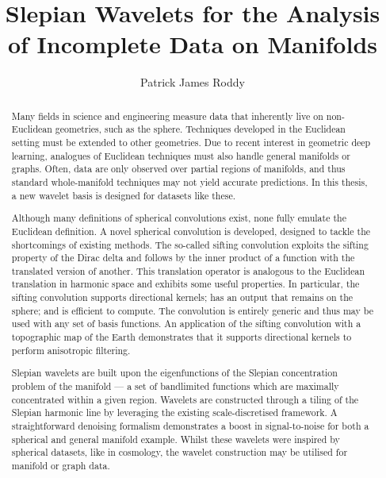 
\title{Slepian Wavelets for the Analysis of Incomplete Data on Manifolds}
\author{Patrick James Roddy}

\maketitle
\makedeclaration{}

\begin{abstract} %
    Many fields in science and engineering measure data that inherently live on non-Euclidean geometries, such as the sphere.
    Techniques developed in the Euclidean setting must be extended to other geometries.
    Due to recent interest in geometric deep learning, analogues of Euclidean techniques must also handle general manifolds or graphs.
    Often, data are only observed over partial regions of manifolds, and thus standard whole-manifold techniques may not yield accurate predictions.
    In this thesis, a new wavelet basis is designed for datasets like these.

    Although many definitions of spherical convolutions exist, none fully emulate the Euclidean definition.
    A novel spherical convolution is developed, designed to tackle the shortcomings of existing methods.
    The so-called sifting convolution exploits the sifting property of the Dirac delta and follows by the inner product of a function with the translated version of another.
    This translation operator is analogous to the Euclidean translation in harmonic space and exhibits some useful properties.
    In particular, the sifting convolution supports directional kernels; has an output that remains on the sphere; and is efficient to compute.
    The convolution is entirely generic and thus may be used with any set of basis functions.
    An application of the sifting convolution with a topographic map of the Earth demonstrates that it supports directional kernels to perform anisotropic filtering.

    Slepian wavelets are built upon the eigenfunctions of the Slepian concentration problem of the manifold --- a set of bandlimited functions which are maximally concentrated within a given region.
    Wavelets are constructed through a tiling of the Slepian harmonic line by leveraging the existing scale-discretised framework.
    A straightforward denoising formalism demonstrates a boost in signal-to-noise for both a spherical and general manifold example.
    Whilst these wavelets were inspired by spherical datasets, like in cosmology, the wavelet construction may be utilised for manifold or graph data.
\end{abstract}


